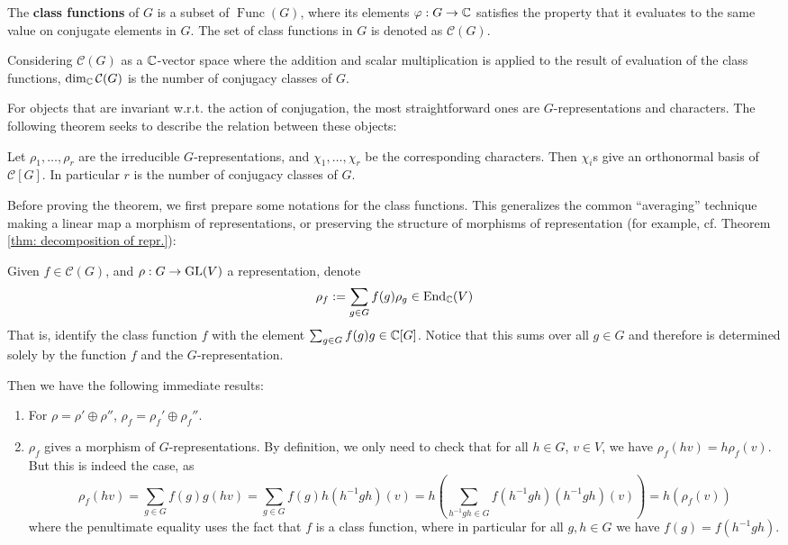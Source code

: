 \documentclass{article}
\begin{document}
\begin{definition}
    The \textbf{class functions} of $G$ is a subset of $\operatorname{Func}(G)$, where its elements $\varphi: G \to \mathbb{C}$ satisfies the property that it evaluates to the same value on conjugate elements in $G$. The set of class functions in $G$ is denoted as $\mathcal{C}(G)$. 
\end{definition}

\begin{remark}
    Considering $\mathcal{C}(G)$ as a $\mathbb{C}$-vector space where the addition and scalar multiplication is applied to the result of evaluation of the class functions, $\dim_{\mathbb{C}} \mathcal{C}(G)$ is the number of conjugacy classes of $G$.
\end{remark}

\textstart
For objects that are invariant w.r.t. the action of conjugation, the most straightforward ones are $G$-representations and characters. The following theorem seeks to describe the relation between these objects:

\begin{theorem}\label{thm: character of irred repres gives a basis of C(G)}
    Let $\rho_1, \dots, \rho_r$ are the irreducible $G$-representations, and $\chi_1, \dots, \chi_r$ be the corresponding characters. Then $\chi_i$s give an orthonormal basis of $\mathcal{C}[G]$. In particular $r$ is the number of conjugacy classes of $G$.
\end{theorem}

\textstart
Before proving the theorem, we first prepare some notations for the class functions. This generalizes the common ``averaging'' technique making a linear map a morphism of representations, or preserving the structure of morphisms of representation (for example, cf. Theorem \ref{thm: decomposition of repr.}):

\begin{notation}
    Given $f \in \mathcal{C}(G)$, and $\rho: G \to \mathrm{GL}(V)$ a representation, denote
    \[
        \rho_f := \sum_{g \in G} f(g) \rho_g \in \mathrm{End}_{\mathbb{C}}(V)
    \]
    That is, identify the class function $f$ with the element $\sum_{g \in G} f(g) g \in \mathbb{C}[G]$. Notice that this sums over all $g \in G$ and therefore is determined solely by the function $f$ and the $G$-representation.
\end{notation}

\textstart
Then we have the following immediate results:
\begin{enumerate}[label=\arabic*)]
    \item For $\rho = \rho' \oplus \rho''$, $\rho_f = \rho_f' \oplus \rho_f''$.
    \item $\rho_f$ gives a morphism of $G$-representations. By definition, we only need to check that for all $h \in G$, $v \in V$, we have $\rho_f(hv) = h \rho_f (v)$. But this is indeed the case, as 
    \[
        \rho_f(hv) = \sum_{g \in G} f(g) g(hv) = \sum_{g \in G} f(g) h(h^{-1}gh)(v) = h \left( \sum_{h^{-1}gh \in G} f(h^{-1}gh) (h^{-1}gh)(v)\right) = h(\rho_f(v))
    \]
    where the penultimate equality uses the fact that $f$ is a class function, where in particular for all $g, h \in G$ we have $f(g) = f(h^{-1}gh)$.
\end{enumerate}
\end{document}
